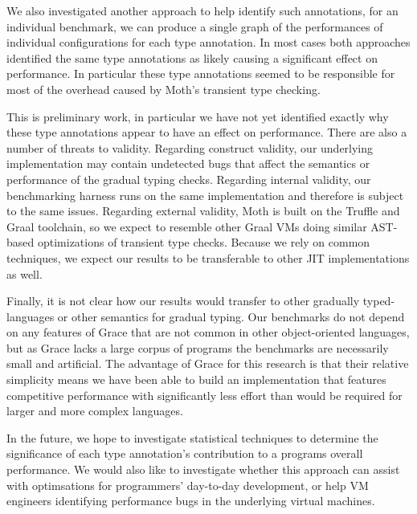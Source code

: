 \documentclass[sigplan,10pt,review,screen]{acmart}\settopmatter{printfolios=true}
\newcommand{\RR}[1]{{\color{red}RR: #1}}
\begin{document}
We also investigated another approach to help identify such annotations, for an individual benchmark, we can produce a single graph of the performances of individual configurations for each type annotation. 
In most cases both approaches identified the same type annotations as likely causing a significant effect on performance. In particular these type annotations seemed to be responsible for most of the overhead caused by Moth's transient type checking.

This is preliminary work, in particular we have not yet identified exactly why these type annotations appear to have an effect on performance.
There are also a number of threats to validity. 
Regarding construct validity, 
our underlying
implementation may contain undetected bugs that affect the semantics
or performance of the gradual typing checks. Regarding internal
validity,
our benchmarking harness runs on the same implementation
and therefore is subject to the same issues.
Regarding external validity, 
Moth is built
on the Truffle and Graal toolchain, so we expect
to resemble other Graal
VMs doing similar AST-based optimizations of transient type checks.
Because we rely on common techniques, 
we expect our results to be transferable to other JIT implementations as well.

Finally, it is not clear how our results would transfer
to other gradually typed-languages or other semantics for gradual typing.
Our benchmarks do not depend on any features of Grace
that are not common in other object-oriented
languages, but as Grace lacks a large corpus of programs the
benchmarks are necessarily small and artificial.
The advantage of Grace for this research is
that their relative simplicity means we have been able to build an
implementation that features competitive performance with significantly less
effort than would be required for larger and more complex languages.

In the future, we hope to investigate statistical techniques to
determine the significance of each type annotation's contribution to a
programs overall performance. We would also like to investigate 
whether this approach can assist with optimsations for programmers' day-to-day  development, or help VM engineers identifying performance bugs in the underlying virtual machines.


\end{document}
